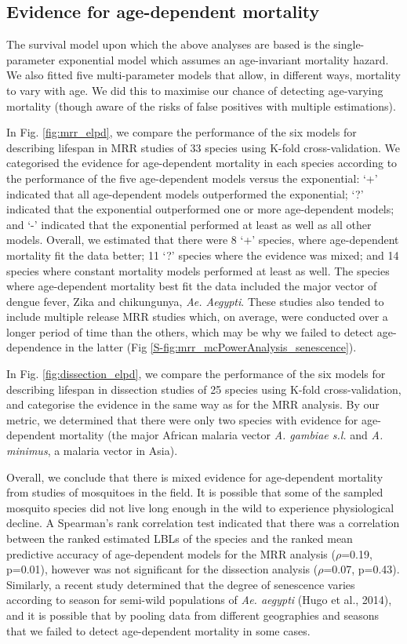 \documentclass[]{article}
\begin{document}
\subsection{Evidence for age-dependent
mortality}\label{evidence-for-age-dependent-mortality}

The survival model upon which the above analyses are based is the
single-parameter exponential model which assumes an age-invariant
mortality hazard. We also fitted five multi-parameter models that allow,
in different ways, mortality to vary with age. We did this to maximise
our chance of detecting age-varying mortality (though aware of the risks
of false positives with multiple estimations).

In Fig. \ref{fig:mrr_elpd}, we compare the performance of the six models for describing
lifespan in MRR studies of 33 species using K-fold cross-validation. We
categorised the evidence for age-dependent mortality in each species
according to the performance of the five age-dependent models versus the
exponential: `+' indicated that all age-dependent models outperformed
the exponential; `?' indicated that the exponential outperformed one or
more age-dependent models; and `-' indicated that the exponential
performed at least as well as all other models. Overall, we estimated
that there were 8 `+' species, where age-dependent mortality fit the
data better; 11 `?' species where the evidence was mixed; and 14 species
where constant mortality models performed at least as well. The species
where age-dependent mortality best fit the data included the major
vector of dengue fever, Zika and chikungunya, \emph{Ae. Aegypti}. These
studies also tended to include multiple release MRR studies which, on
average, were conducted over a longer period of time than the others,
which may be why we failed to detect age-dependence in the latter (Fig
\ref{S-fig:mrr_mcPowerAnalysis_senescence}).

In Fig. \ref{fig:dissection_elpd}, we compare the performance of the six models for describing
lifespan in dissection studies of 25 species using K-fold
cross-validation, and categorise the evidence in the same way as for the
MRR analysis. By our metric, we determined that there were only two
species with evidence for age-dependent mortality (the major African
malaria vector \emph{A. gambiae s.l.} and \emph{A. minimus}, a malaria
vector in Asia).

Overall, we conclude that there is mixed evidence for age-dependent
mortality from studies of mosquitoes in the field. It is possible that
some of the sampled mosquito species did not live long enough in the
wild to experience physiological decline. A Spearman's rank correlation
test indicated that there was a correlation between the ranked estimated
LBLs of the species and the ranked mean predictive accuracy of
age-dependent models for the MRR analysis ($\rho$=0.19, p=0.01), however was
not significant for the dissection analysis ($\rho$=0.07, p=0.43). Similarly,
a recent study determined that the degree of senescence varies according
to season for semi-wild populations of \emph{Ae. aegypti} (Hugo et al.,
2014), and it is possible that by pooling data from different
geographies and seasons that we failed to detect age-dependent mortality
in some cases.
\end{document}
